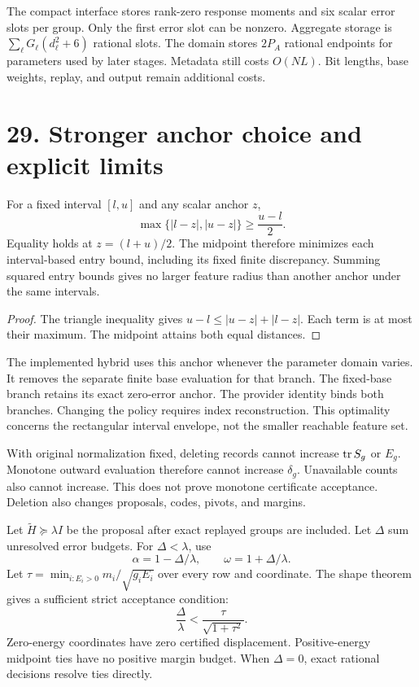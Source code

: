 The compact interface stores rank-zero response moments and six scalar error slots per group.
Only the first error slot can be nonzero.
Aggregate storage is $\sum_\ell G_\ell(d_\ell^2+6)$ rational slots.
The domain stores $2P_A$ rational endpoints for parameters used by later stages.
Metadata still costs $O(NL)$.
Bit lengths, base weights, replay, and output remain additional costs.

\newpage
\section*{29. Stronger anchor choice and explicit limits}
\begin{theorem}
For a fixed interval $[l,u]$ and any scalar anchor $z$,
\[
 \max\{|l-z|,|u-z|\}\ge\frac{u-l}{2}.
\]
Equality holds at $z=(l+u)/2$.
The midpoint therefore minimizes each interval-based entry bound, including its fixed finite discrepancy.
Summing squared entry bounds gives no larger feature radius than another anchor under the same intervals.
\end{theorem}
\begin{proof}
The triangle inequality gives $u-l\le |u-z|+|l-z|$.
Each term is at most their maximum.
The midpoint attains both equal distances.
\end{proof}

The implemented hybrid uses this anchor whenever the parameter domain varies.
It removes the separate finite base evaluation for that branch.
The fixed-base branch retains its exact zero-error anchor.
The provider identity binds both branches.
Changing the policy requires index reconstruction.
This optimality concerns the rectangular interval envelope, not the smaller reachable feature set.

With original normalization fixed, deleting records cannot increase $\operatorname{tr} S_g$ or $E_g$.
Monotone outward evaluation therefore cannot increase $\delta_g$.
Unavailable counts also cannot increase.
This does not prove monotone certificate acceptance.
Deletion also changes proposals, codes, pivots, and margins.

Let $\widetilde H\succeq\lambda I$ be the proposal after exact replayed groups are included.
Let $\Delta$ sum unresolved error budgets.
For $\Delta<\lambda$, use
\[
 \alpha=1-\Delta/\lambda,\qquad \omega=1+\Delta/\lambda.
\]
Let $\tau=\min_{i:E_i>0}m_i/\sqrt{g_iE_i}$ over every row and coordinate.
The shape theorem gives a sufficient strict acceptance condition:
\[
 \frac{\Delta}{\lambda}<\frac{\tau}{\sqrt{1+\tau^2}}.
\]
Zero-energy coordinates have zero certified displacement.
Positive-energy midpoint ties have no positive margin budget.
When $\Delta=0$, exact rational decisions resolve ties directly.


